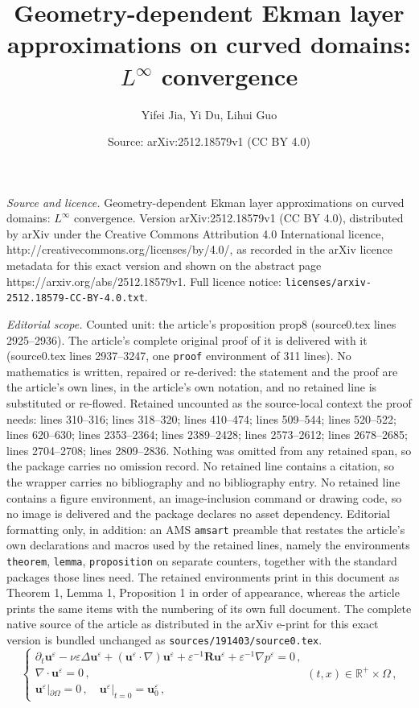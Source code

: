 \documentclass[10pt,a4paper]{amsart}
\title{Geometry-dependent Ekman layer approximations on curved domains: $L^\infty$ convergence}
\author{Yifei Jia, Yi Du, Lihui Guo}
\date{Source: arXiv:2512.18579v1 (CC BY 4.0)}
\begin{document}
\maketitle

\noindent\emph{Source and licence.} Geometry-dependent Ekman layer approximations on curved domains: $L^\infty$ convergence. Version arXiv:2512.18579v1 (CC BY 4.0), distributed by arXiv under the Creative Commons Attribution 4.0 International licence, http://creativecommons.org/licenses/by/4.0/, as recorded in the arXiv licence metadata for this exact version and shown on the abstract page https://arxiv.org/abs/2512.18579v1. Full licence notice: \texttt{licenses/arxiv-2512.18579-CC-BY-4.0.txt}.\par\smallskip

\noindent\textit{Editorial scope.} Counted unit: the article's proposition prop8 (source0.tex lines 2925--2936). The article's complete original proof of it is delivered with it (source0.tex lines 2937--3247, one \texttt{proof} environment of 311 lines). No mathematics is written, repaired or re-derived: the statement and the proof are the article's own lines, in the article's own notation, and no retained line is substituted or re-flowed.  Retained uncounted as the source-local context the proof needs: lines 310--316; lines 318--320; lines 410--474; lines 509--544; lines 520--522; lines 620--630; lines 2353--2364; lines 2389--2428; lines 2573--2612; lines 2678--2685; lines 2704--2708; lines 2809--2836.  Nothing was omitted from any retained span, so the package carries no omission record.  No retained line contains a citation, so the wrapper carries no bibliography and no bibliography entry.  No retained line contains a figure environment, an image-inclusion command or drawing code, so no image is delivered and the package declares no asset dependency.  Editorial formatting only, in addition: an AMS \texttt{amsart} preamble that restates the article's own declarations and macros used by the retained lines, namely the environments \texttt{theorem}, \texttt{lemma}, \texttt{proposition} on separate counters, together with the standard packages those lines need.  The retained environments print in this document as Theorem 1, Lemma 1, Proposition 1 in order of appearance, whereas the article prints the same items with the numbering of its own full document.  The complete native source of the article as distributed in the arXiv e-print for this exact version is bundled unchanged as \texttt{sources/191403/source0.tex}.
\begin{equation}\label{1.11}
	\begin{cases}
		\partial_t \boldsymbol{u}^\varepsilon-\nu\varepsilon \Delta \boldsymbol{u}^\varepsilon+(\boldsymbol{u}^\varepsilon \cdot \nabla)\boldsymbol{u}^\varepsilon+\varepsilon^{-1}\boldsymbol{R}\boldsymbol{u}^\varepsilon+\varepsilon^{-1}\nabla p^\varepsilon=0\,,\\
		\nabla\cdot \boldsymbol{u}^\varepsilon=0\,,\\
		\boldsymbol{u}^\varepsilon|_{\partial\Omega}=0\,,\quad \boldsymbol{u}^\varepsilon|_{t=0}=\boldsymbol{u}_0^\varepsilon\,,
	\end{cases}  (t,x)\in \mathbb{R}^+\times \Omega\,,
\end{equation}
\end{document}
